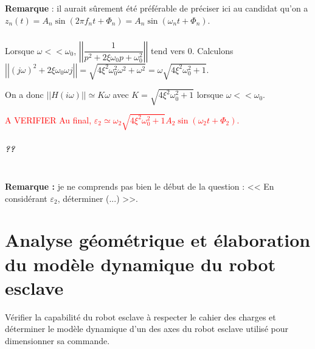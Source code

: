 \documentclass[10pt,fleqn]{article} %
\begin{document}
\textbf{Remarque }: il aurait sûrement été préférable de préciser ici au candidat qu'on a $z_n(t)=A_n\sin \left(2\pi f_n t + \Phi_n \right)=A_n\sin \left(\omega_n t + \Phi_n \right)$. 


\subparagraph{}	
Lorsque $\omega << \omega_0$, $\left|\left|  \dfrac{1}{p^2+2\xi\omega_0 p + \omega_0^2} \right|\right|$ tend vers 0. Calculons $\left|\left|  \left( j \omega \right) ^2+2\xi\omega_0  \omega j  \right|\right| =\sqrt{4\xi^2\omega_0^2 \omega^2 + \omega^2} =\omega \sqrt{4\xi^2\omega_0^2  + 1}$. 

On a donc $|| H\left( i\omega\right)|| \simeq K\omega $ avec $K=\sqrt{4\xi^2\omega_0^2  + 1}$ lorsque $\omega << \omega_0$.

\textcolor{red}{A VERIFIER Au final, $\varepsilon_2 \simeq \omega_2 \sqrt{4\xi^2\omega_0^2  + 1} A_2\sin \left(\omega_2 t + \Phi_2 \right) $.}

\subparagraph{??}	~\\




\textbf{Remarque :} je ne comprends pas bien le début de la question : << En considérant $\varepsilon_2$, déterminer (...) >>.

\section{Analyse géométrique et élaboration du modèle dynamique du robot esclave}

\begin{obj}
Vérifier la capabilité du robot esclave à respecter le cahier des charges et déterminer le modèle dynamique
d’un des axes du robot esclave utilisé pour dimensionner sa commande.
\end{obj}
\end{document}
